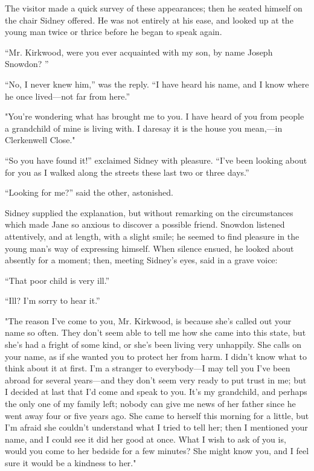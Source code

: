The visitor made a quick survey of these appearances; then he seated
himself on the chair Sidney offered. He was not entirely at his ease,
and looked up at the young man twice or thrice before he began to speak
again.

``Mr. Kirkwood, were you ever acquainted with my son, by name Joseph
Snowdon? ''

``No, I never knew him,'' was the reply. ``I have heard his name, and I
know where he once lived---not far from here.''

"You're wondering what has brought me {\protect\hypertarget{145}{}{}}to
you. I have heard of you from people a grandchild of mine is living
with. I daresay it is the house you mean,---in Clerkenwell Close."

``So you have found it!'' exclaimed Sidney with pleasure. ``I've been
looking about for you as I walked along the streets these last two or
three days.''

``Looking for me?'' said the other, astonished.

Sidney supplied the explanation, but without remarking on the
circumstances which made Jane so anxious to discover a possible friend.
Snowdon listened attentively, and at length, with a slight smile; he
seemed to find pleasure in the young man's way of expressing himself.
When silence ensued, he looked about absently for a moment; then,
meeting Sidney's eyes, said in a grave voice:

``That poor child is very ill.''

``Ill? I'm sorry to hear it.''

"The reason I've come to you, Mr. Kirkwood, is because she's called out
your name so often. They don't seem able to tell me
{\protect\hypertarget{146}{}{}}how she came into this state, but she's
had a fright of some kind, or she's been living very unhappily. She
calls on your name, as if she wanted you to protect her from harm. I
didn't know what to think about it at first. I'm a stranger to
everybody---I may tell you I've been abroad for several years---and they
don't seem very ready to put trust in me; but I decided at last that I'd
come and speak to you. It's my grandchild, and perhaps the only one of
my family left; nobody can give me news of her father since he went away
four or five years ago. She came to herself this morning for a little,
but I'm afraid she couldn't understand what I tried to tell her; then I
mentioned your name, and I could see it did her good at once. What I
wish to ask of you is, would you come to her bedside for a few minutes?
She might know you, and I feel sure it would be a kindness to her."

